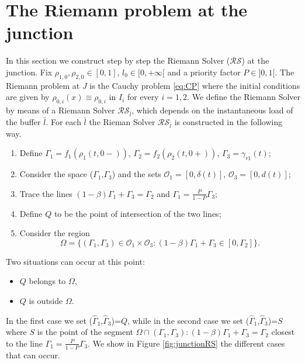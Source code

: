 \documentclass[12pt,subeqn]{article}
\numberwithin{equation}{section}
\newcommand{\Riem}{\mathcal{RS}}
\newcommand{\Rieml}{\Riem_{\bar{l}}}
\newcommand{\OO}{\mathcal{O}}
\begin{document}
\section{The Riemann problem at the junction}
In this section we construct step by step the Riemann Solver ($\mathcal{RS}$) at the junction.
Fix $\rho_{1,0},\rho_{2,0} \in [0,1]$, $l_0 \in [0,+\infty[$ and a priority factor $P \in ]0,1[$. The Riemann problem at $J$ is the Cauchy problem \eqref{eq:CP} where the initial conditions are given by $\rho_{0,i}(x)\equiv \rho_{0,i} $ in $I_i$ for every $i=1,2$. We define the Riemann Solver by means of a Riemann Solver $\Rieml$, which depends on the instantaneous load of the buffer $\bar{l}$. For each $\bar{l}$ the Rieman Solver $\Rieml$ is constructed in the following way.
\begin{enumerate}
	\item Define $\Gamma_1=f_1(\rho_1(t,0-))$, $\Gamma_2=f_2(\rho_2(t,0+))$, $\Gamma_3=\gamma_{r1}(t)$;
	\item Consider the space ($\Gamma_1$,$\Gamma_3$) and the sets $\OO_1=[0,\delta(t)]$, $\OO_3=[0,d(t)]$;
	\item Trace the lines $(1-\beta)\Gamma_1+\Gamma_3=\Gamma_2$ and $\Gamma_1=\frac{P}{1-P}\Gamma_3$;
	\item Define $Q$ to be the point of intersection of the two lines; 
	\item Consider the region $$\Omega=\Big\{  (\Gamma_1,\Gamma_3) \in \OO_1 \times \OO_3 : (1-\beta)\Gamma_1+\Gamma_3 \in [0,\Gamma_2]  \Big\} .$$ 
\end{enumerate}
Two situations can occur at this point:
\begin{itemize}
	\item $Q$ belongs to $\Omega$,
	\item $Q$ is outside $\Omega$.
\end{itemize}
In the first case we set ($\hat{\Gamma}_1$,$\hat{\Gamma}_3$)=$Q$, while in the second case we set ($\hat{\Gamma}_1$,$\hat{\Gamma}_3$)=$S$ where $S$ is the point of the segment $\Omega \cap {(\Gamma_1,\Gamma_3): (1-\beta)\Gamma_1+\Gamma_3=\Gamma_2}$ closest to the line $\Gamma_1=\frac{P}{1-P}\Gamma_3$. We show in Figure \ref{fig:junctionRS} the different cases that can occur.
\end{document}
